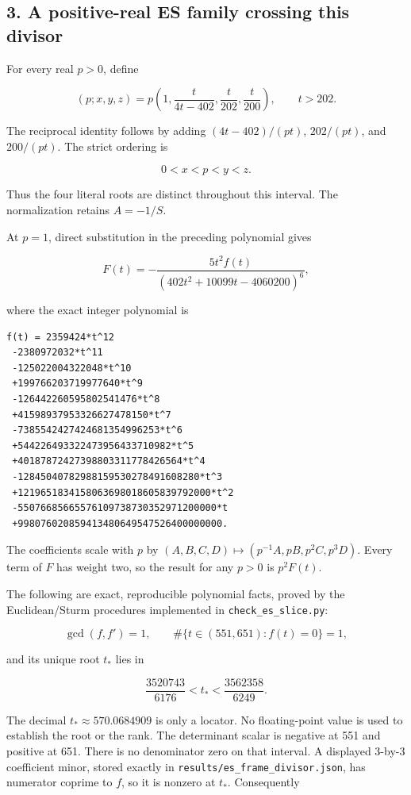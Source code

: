 \subsection{3. A positive-real ES family crossing this
divisor}\label{a-positive-real-es-family-crossing-this-divisor}

For every real \(p>0\), define

\[
 (p;x,y,z)=p\left(1,\frac{t}{4t-402},\frac{t}{202},\frac{t}{200}\right),
 \qquad t>202.
\]

The reciprocal identity follows by adding \((4t-402)/(pt)\),
\(202/(pt)\), and \(200/(pt)\). The strict ordering is

\[
 0<x<p<y<z.
\]

Thus the four literal roots are distinct throughout this interval. The
normalization retains \(A=-1/S\).

At \(p=1\), direct substitution in the preceding polynomial gives

\[
 F(t)=-\frac{5t^2 f(t)}{(402t^2+10099t-4060200)^6},
\]

where the exact integer polynomial is

\begin{verbatim}
f(t) = 2359424*t^12
 -2380972032*t^11
 -125022004322048*t^10
 +199766203719977640*t^9
 -126442260595802541476*t^8
 +41598937953326627478150*t^7
 -7385542427424681354996253*t^6
 +544226493322473956433710982*t^5
 +40187872427398803311778426564*t^4
 -12845040782988159530278491608280*t^3
 +1219651834158063698018605839792000*t^2
 -55076685665576109738730352971200000*t
 +998076020859413480649547526400000000.
\end{verbatim}

The coefficients scale with \(p\) by
\((A,B,C,D)\mapsto(p^{-1}A,pB,p^2C,p^3D)\). Every term of \(F\) has
weight two, so the result for any \(p>0\) is \(p^2F(t)\).

The following are exact, reproducible polynomial facts, proved by the
Euclidean/Sturm procedures implemented in \texttt{check\_es\_slice.py}:

\[
 \gcd(f,f')=1,\qquad \#\{t\in(551,651):f(t)=0\}=1,
\]

and its unique root \(t_*\) lies in

\[
 \boxed{\frac{3520743}{6176}<t_*<\frac{3562358}{6249}.}
\]

The decimal \(t_*\approx570.0684909\) is only a locator. No
floating-point value is used to establish the root or the rank. The
determinant scalar is negative at 551 and positive at 651. There is no
denominator zero on that interval. A displayed 3-by-3 coefficient minor,
stored exactly in \texttt{results/es\_frame\_divisor.json}, has
numerator coprime to \(f\), so it is nonzero at \(t_*\). Consequently

